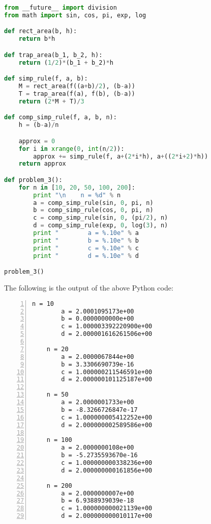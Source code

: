 \documentclass[12pt]{article}
\begin{document}
\begin{lstlisting}[language=Python, caption=Problem 3 source code]
from __future__ import division
from math import sin, cos, pi, exp, log

def rect_area(b, h):
    return b*h

def trap_area(b_1, b_2, h):
    return (1/2)*(b_1 + b_2)*h

def simp_rule(f, a, b):
    M = rect_area(f((a+b)/2), (b-a))
    T = trap_area(f(a), f(b), (b-a))
    return (2*M + T)/3

def comp_simp_rule(f, a, b, n):
    h = (b-a)/n

    approx = 0
    for i in xrange(0, int(n/2)):
        approx += simp_rule(f, a+(2*i*h), a+((2*i+2)*h))
    return approx    

def problem_3():
    for n in [10, 20, 50, 100, 200]:
        print "\n    n = %d" % n
        a = comp_simp_rule(sin, 0, pi, n)
        b = comp_simp_rule(cos, 0, pi, n)
        c = comp_simp_rule(sin, 0, (pi/2), n)
        d = comp_simp_rule(exp, 0, log(3), n)
        print "        a = %.10e" % a
        print "        b = %.10e" % b
        print "        c = %.10e" % c
        print "        d = %.10e" % d

problem_3()
\end{lstlisting}
The following is the output of the above Python code:
\begin{Verbatim}[fontfamily=courier, numbers=left, numbersep=2pt, fontsize=\small]
    n = 10
        a = 2.0001095173e+00
        b = 0.0000000000e+00
        c = 1.000003392220900e+00
        d = 2.000001616261506e+00

    n = 20
        a = 2.0000067844e+00
        b = 3.3306690739e-16
        c = 1.000000211546591e+00
        d = 2.000000101125187e+00

    n = 50
        a = 2.0000001733e+00
        b = -8.3266726847e-17
        c = 1.000000005412252e+00
        d = 2.000000002589586e+00

    n = 100
        a = 2.0000000108e+00
        b = -5.2735593670e-16
        c = 1.000000000338236e+00
        d = 2.000000000161856e+00

    n = 200
        a = 2.0000000007e+00
        b = 6.9388939039e-18
        c = 1.000000000021139e+00
        d = 2.000000000010117e+00
\end{Verbatim}
\end{document}
